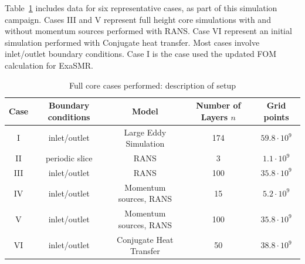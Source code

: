Table~\ref{tab:full core} includes data for six representative cases, as part of this simulation campaign. Cases III and V represent full height core simulations with and without momentum sources performed with RANS. Case VI represent an initial simulation performed with Conjugate heat transfer. Most cases involve inlet/outlet boundary conditions. Case I is the case used the updated FOM calculation for ExaSMR.

\begin{table} \centering \small
 \begin{tabular}{ccccc} \hline \hline
  Case & Boundary conditions & Model & Number of Layers $n$ & Grid points \\ \hline
   I & inlet/outlet & Large Eddy Simulation & 174 & $59.8 \cdot 10^{9}$ \\
   II & periodic slice & RANS & 3 & $1.1 \cdot 10^{9}$ \\
   III & inlet/outlet & RANS & 100 & $35.8 \cdot 10^{9}$ \\
   IV & inlet/outlet & Momentum sources, RANS & 15 & $5.2 \cdot 10^{9}$ \\
   V & inlet/outlet & Momentum sources, RANS & 100 & $35.8 \cdot 10^{9}$ \\
   VI & inlet/outlet & Conjugate Heat Transfer & 50 & $38.8 \cdot 10^{9}$ \\
   \hline \hline
\end{tabular}
 \caption{Full core cases performed: description of setup}
 \label{tab:full core}
\end{table}
